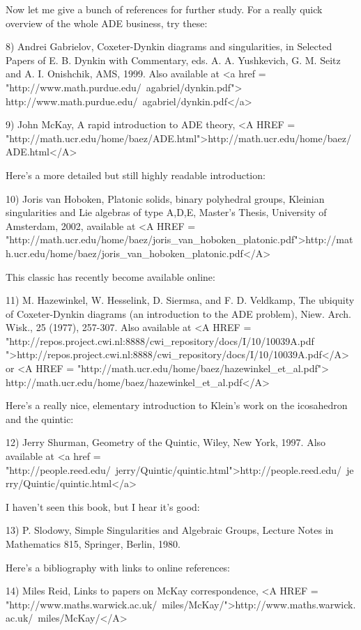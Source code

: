 Now let me give a bunch of references for further study.  For a
really quick overview of the whole ADE business, try these:

8) Andrei Gabrielov, Coxeter-Dynkin diagrams and singularities,
in Selected Papers of E. B. Dynkin with Commentary, eds. A. A.
Yushkevich, G. M. Seitz and A. I. Onishchik, AMS, 1999.
Also available at 
<a href = "http://www.math.purdue.edu/~agabriel/dynkin.pdf">
http://www.math.purdue.edu/~agabriel/dynkin.pdf</a>

9) John McKay, A rapid introduction to ADE theory, 
<A HREF = "http://math.ucr.edu/home/baez/ADE.html">http://math.ucr.edu/home/baez/ADE.html</A>

Here's a more detailed but still highly readable introduction:

10) Joris van Hoboken, Platonic solids, binary polyhedral groups, 
Kleinian singularities and Lie algebras of type A,D,E, Master's Thesis, 
University of Amsterdam, 2002, available at 
<A HREF = "http://math.ucr.edu/home/baez/joris_van_hoboken_platonic.pdf">http://math.ucr.edu/home/baez/joris_van_hoboken_platonic.pdf</A>

This classic has recently become available online:

11) M. Hazewinkel, W. Hesselink, D. Siermsa, and F. D. Veldkamp, The 
ubiquity of Coxeter-Dynkin diagrams (an introduction to the ADE problem), 
Niew. Arch. Wisk., 25 (1977), 257-307.
Also available at
<A HREF = "http://repos.project.cwi.nl:8888/cwi_repository/docs/I/10/10039A.pdf
">http://repos.project.cwi.nl:8888/cwi_repository/docs/I/10/10039A.pdf</A>
or 
<A HREF = "http://math.ucr.edu/home/baez/hazewinkel_et_al.pdf">
http://math.ucr.edu/home/baez/hazewinkel_et_al.pdf</A>

Here's a really nice, elementary introduction to Klein's work on
the icosahedron and the quintic:

12) Jerry Shurman, Geometry of the Quintic, Wiley, New York, 1997.
Also available at <a href = "http://people.reed.edu/~jerry/Quintic/quintic.html">http://people.reed.edu/~jerry/Quintic/quintic.html</a>

I haven't seen this book, but I hear it's good:

13) P. Slodowy, Simple Singularities and Algebraic Groups, 
Lecture Notes in Mathematics 815, Springer, Berlin, 1980.

Here's a bibliography with links to online references:

14) Miles Reid, Links to papers on McKay correspondence, 
<A HREF = "http://www.maths.warwick.ac.uk/~miles/McKay/">http://www.maths.warwick.ac.uk/~miles/McKay/</A>

